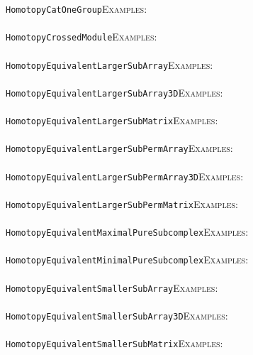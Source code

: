\documentclass[a4paper,11pt]{report}
\begin{document}
{{ \texttt{HomotopyCatOneGroup}{\nobreakspace}{\nobreakspace}{\nobreakspace}{\nobreakspace}\textsc{Examples:} \\
 \\
 \texttt{HomotopyCrossedModule}{\nobreakspace}{\nobreakspace}{\nobreakspace}{\nobreakspace}\textsc{Examples:} \\
 \\
 \texttt{HomotopyEquivalentLargerSubArray}{\nobreakspace}{\nobreakspace}{\nobreakspace}{\nobreakspace}\textsc{Examples:} \\
 \\
 \texttt{HomotopyEquivalentLargerSubArray3D}{\nobreakspace}{\nobreakspace}{\nobreakspace}{\nobreakspace}\textsc{Examples:} \\
 \\
 \texttt{HomotopyEquivalentLargerSubMatrix}{\nobreakspace}{\nobreakspace}{\nobreakspace}{\nobreakspace}\textsc{Examples:} \\
 \\
 \texttt{HomotopyEquivalentLargerSubPermArray}{\nobreakspace}{\nobreakspace}{\nobreakspace}{\nobreakspace}\textsc{Examples:} \\
 \\
 \texttt{HomotopyEquivalentLargerSubPermArray3D}{\nobreakspace}{\nobreakspace}{\nobreakspace}{\nobreakspace}\textsc{Examples:} \\
 \\
 \texttt{HomotopyEquivalentLargerSubPermMatrix}{\nobreakspace}{\nobreakspace}{\nobreakspace}{\nobreakspace}\textsc{Examples:} \\
 \\
 \texttt{HomotopyEquivalentMaximalPureSubcomplex}{\nobreakspace}{\nobreakspace}{\nobreakspace}{\nobreakspace}\textsc{Examples:} \\
 \\
 \texttt{HomotopyEquivalentMinimalPureSubcomplex}{\nobreakspace}{\nobreakspace}{\nobreakspace}{\nobreakspace}\textsc{Examples:} \\
 \\
 \texttt{HomotopyEquivalentSmallerSubArray}{\nobreakspace}{\nobreakspace}{\nobreakspace}{\nobreakspace}\textsc{Examples:} \\
 \\
 \texttt{HomotopyEquivalentSmallerSubArray3D}{\nobreakspace}{\nobreakspace}{\nobreakspace}{\nobreakspace}\textsc{Examples:} \\
 \\
 \texttt{HomotopyEquivalentSmallerSubMatrix}{\nobreakspace}{\nobreakspace}{\nobreakspace}{\nobreakspace}\textsc{Examples:} \\
}}
\end{document}
